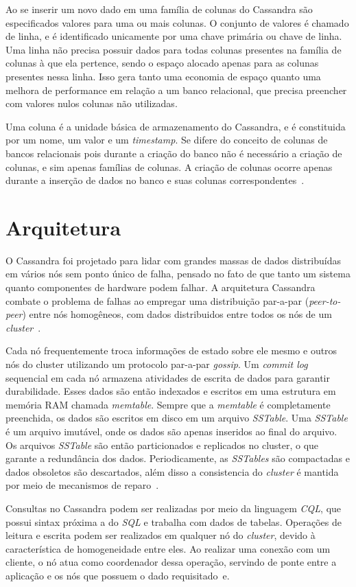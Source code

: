 Ao se inserir um novo dado em uma família de colunas do Cassandra são especificados valores para uma ou mais colunas. O conjunto de valores é chamado de linha, e é identificado unicamente por uma chave primária ou chave de linha. Uma linha não precisa possuir dados para todas colunas presentes na família de colunas à que ela pertence, sendo o espaço alocado apenas para as colunas presentes nessa linha. Isso gera tanto uma economia de espaço quanto uma melhora de performance em relação a um banco relacional, que precisa preencher com valores nulos colunas não utilizadas.

Uma coluna é a unidade básica de armazenamento do Cassandra, e é constituida por um nome, um valor e um \emph{timestamp}. Se difere do conceito de colunas de bancos relacionais pois durante a criação do banco não é necessário a criação de colunas, e sim apenas famílias de colunas. A criação de colunas ocorre apenas durante a inserção de dados no banco e suas colunas correspondentes~\cite{cassandraguide}.

\section{Arquitetura}

O Cassandra foi projetado para lidar com grandes massas de dados distribuídas em vários nós sem ponto único de falha, pensado no fato de que tanto um sistema quanto componentes de hardware podem falhar.
A arquitetura Cassandra combate o problema de falhas ao empregar uma distribuição par-a-par (\emph{peer-to-peer}) entre nós homogêneos, com dados distribuidos entre todos os nós de um \emph{cluster}~\cite{cassandradocs}. 

Cada nó frequentemente troca informações de estado sobre ele mesmo e outros nós do cluster utilizando um  protocolo par-a-par \emph{gossip}. Um \emph{commit log} sequencial em cada nó armazena atividades de escrita de dados para garantir durabilidade. Esses dados são então indexados e escritos em uma estrutura em memória RAM chamada \emph{memtable}. Sempre que a \emph{memtable} é completamente preenchida, os dados são escritos em disco em um arquivo \emph{SSTable}. Uma \emph{SSTable} é um arquivo imutável, onde os dados são apenas inseridos ao final do arquivo. Os arquivos \emph{SSTable} são então particionados e replicados no cluster, o que garante a redundância dos dados. Periodicamente, as \emph{SSTables} são compactadas e dados obsoletos são descartados, além disso a consistencia do \emph{cluster} é mantida por meio de mecanismos de reparo~\cite{cassandradocs}.

Consultas no Cassandra podem ser realizadas por meio da linguagem \emph{CQL}, que possui sintax próxima a do \emph{SQL} e trabalha com dados de tabelas. Operações de leitura e escrita podem ser realizados em qualquer nó do \emph{cluster}, devido à característica de homogeneidade entre eles. Ao realizar uma conexão com um cliente, o nó atua como coordenador dessa operação, servindo de ponte entre a aplicação e os nós que possuem o dado requisitado~\cite{cassandradocs}e. 